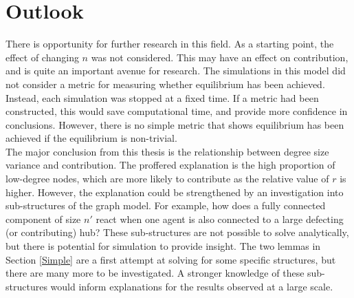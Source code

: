  
\section{Outlook}
There is opportunity for further research in this field. As a starting point, the effect of changing $n$ was not considered. This may have an effect on contribution, and is quite an important avenue for research. The simulations in this model did not consider a metric for measuring whether equilibrium has been achieved. Instead, each simulation was stopped at a fixed time. If a metric had been constructed, this would save computational time, and provide more confidence in conclusions. However, there is no simple metric that shows equilibrium has been achieved if the equilibrium is non-trivial. \\

The major conclusion from this thesis is the relationship between degree size variance and contribution. The proffered explanation is the high proportion of low-degree nodes, which are more likely to contribute as the relative value of $r$ is higher. However, the explanation could be strengthened by an investigation into sub-structures of the graph model. For example, how does a fully connected component of size $n'$ react when one agent is also connected to a large defecting (or contributing) hub? These sub-structures are not possible to solve analytically, but there is potential for simulation to provide insight. The two lemmas in Section \ref{Simple} are a first attempt at solving for some specific structures, but there are many more to be investigated. A stronger knowledge of these sub-structures would inform explanations for the results observed at a large scale. \\




